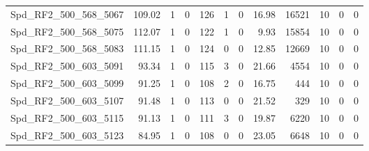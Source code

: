 \begin{longtable}[c]{@{}lrrrrrrrrrrr@{}}
Spd\_RF2\_500\_568\_5067     & 109.02                 & 1                       & 0                       & 126                    & 1                       & 0                       & 16.98                   & 16521                    & 10                       & 0                        & 0                        \\
Spd\_RF2\_500\_568\_5075     & 112.07                 & 1                       & 0                       & 122                    & 1                       & 0                       & 9.93                    & 15854                    & 10                       & 0                        & 0                        \\
Spd\_RF2\_500\_568\_5083     & 111.15                 & 1                       & 0                       & 124                    & 0                       & 0                       & 12.85                   & 12669                    & 10                       & 0                        & 0                        \\
Spd\_RF2\_500\_603\_5091     & 93.34                  & 1                       & 0                       & 115                    & 3                       & 0                       & 21.66                   & 4554                     & 10                       & 0                        & 0                        \\
Spd\_RF2\_500\_603\_5099     & 91.25                  & 1                       & 0                       & 108                    & 2                       & 0                       & 16.75                   & 444                      & 10                       & 0                        & 0                        \\
Spd\_RF2\_500\_603\_5107     & 91.48                  & 1                       & 0                       & 113                    & 0                       & 0                       & 21.52                   & 329                      & 10                       & 0                        & 0                        \\
Spd\_RF2\_500\_603\_5115     & 91.13                  & 1                       & 0                       & 111                    & 3                       & 0                       & 19.87                   & 6220                     & 10                       & 0                        & 0                        \\
Spd\_RF2\_500\_603\_5123     & 84.95                  & 1                       & 0                       & 108                    & 0                       & 0                       & 23.05                   & 6648                     & 10                       & 0                        & 0                        \\

\end{longtable}
